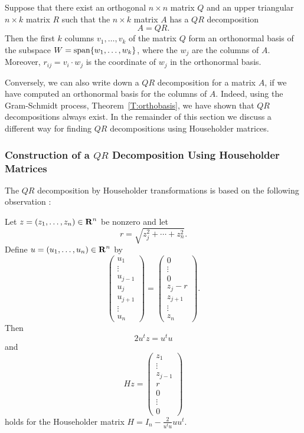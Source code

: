 \begin{prop} \label{prop:qrdec}
Suppose that there exist an orthogonal $n\times n$ matrix $Q$ and an upper
triangular $n\times k$ matrix $R$ such that the $n\times k$ matrix $A$ has
a $QR$ decomposition
\[
A=QR.
\]
Then the first $k$ columns $v_1,\ldots,v_k$ of the matrix $Q$ form an
orthonormal basis
of the subspace $W={\rm span}\{w_1,\ldots,w_k\}$, where the $w_j$
are the columns of $A$.  Moreover, $r_{ij}=v_i\cdot w_j$ is the coordinate
of $w_j$ in the orthonormal basis.
\end{prop}

Conversely, we can also write down a $QR$ decomposition for a matrix $A$, if
we have computed an orthonormal basis for the columns of $A$.  Indeed, using
the Gram-Schmidt process, Theorem~\ref{T:orthobasis}, we have shown that
$QR$ decompositions always exist.  In the remainder of this section we
discuss a different way for finding $QR$ decompositions using Householder
matrices.


\subsubsection*{Construction of a $QR$ Decomposition Using Householder
Matrices} 

The $QR$ decomposition by Householder transformations is based on the
following observation :

\begin{prop} \label{prop:Housej}
Let $z=(z_1,\ldots,z_n)\in\mbox{$\bf{R}$}^n$ be nonzero and let
\[
r=\sqrt{z_j^2  + \cdots + z_n^2}.
\]
Define $u=(u_1,\ldots,u_n)\in\mbox{$\bf{R}$}^n$ by
\[
\left(\begin{array}{c}  u_1 \\ \vdots \\ u_{j-1} \\u_j \\ u_{j+1} \\ \vdots
\\ u_n \end{array}  \right)
=
\left(\begin{array}{c}  0 \\ \vdots \\ 0 \\ z_j-r \\  z_{j+1} \\ \vdots
\\ z_n \end{array}  \right).
\]
Then
\[
2u^t z = u^tu
\]
and
\begin{equation} \label{eq:Housej}
Hz = \left(\begin{array}{c} z_1\\  \vdots\\z_{j-1}\\ r \\ 0\\ \vdots\\ 0
\end{array}\right)
\end{equation}
holds for the Householder matrix $H=I_n-\frac{2}{u^tu}uu^t$.
\end{prop}

